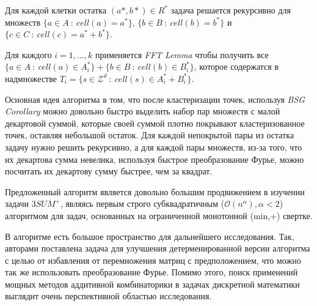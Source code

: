 Для каждой клетки остатка $(a*, b*) \in R^*$ задача решается рекурсивно для множеств $\{a \in A\ :\ cell(a)=a^*\}$, $\{b \in B\ :\ cell(b)=b^*\}$ и $\{c \in C\ :\ cell(c)=a^*+b^*\}$.

Для каждого $i=1, \ldots, k$ применяется \textit{FFT Lemma} чтобы получить все $\{a \in A\ :\ cell(a) \in A_i^*\}+\{b \in B\ :\ cell(b) \in B_i^*\}$, которое содержатся в надмножестве $T_i=\{s \in \mathcal{Z}^d\ :\ cell(s) \in A_i^* + B_i^*\}$.

Основная идея алгоритма в том, что после кластеризации точек, используя \textit{BSG Corollary} можно довольно быстро выделить набор пар множеств с малой декартовой суммой, которые своей суммой плотно покрывают кластеризованное точек, оставляя небольшой остаток. Для каждой непокрытой пары из остатка задачу нужно решить рекурсивно, а для каждой пары множеств, из-за того, что их декартова сумма невелика, используя быстрое преобразование Фурье, можно посчитать их декартову сумму быстрее, чем за квадрат.

Предложенный алгоритм является довольно большим продвижением в изучении задачи $3SUM^+$, являясь первым строго субквадратичным ($\mathcal{O}(n^\alpha), \alpha < 2$) алгоритмом для задач, основанных на ограниченной монотонной (min,+) свертке.

В алгоритме есть большое пространство для дальнейшего исследования. Так, авторами поставлена задача для улучшения детерменированной версии алгоритма с целью от избавления от перемножения матриц с предположением, что можно так же использовать преобразование Фурье. Помимо этого, поиск применений мощных методов аддитивной комбинаторики в задачах дискретной математики выглядит очень перспективной областью исследования.
